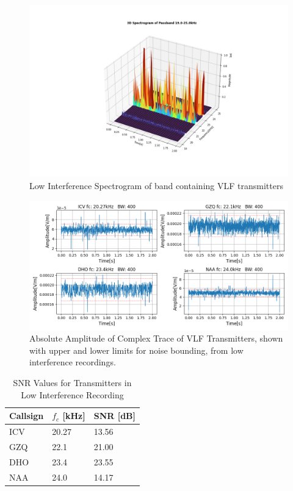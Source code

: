 \begin{figure}
    \centering
    \includegraphics[width = \textwidth]{figs/sig_character/Charmy/3dspectrogram.png}
    \caption{Low Interference Spectrogram of band containing VLF transmitters}
    \label{fig:charmy3Dspect}
\end{figure}

\begin{figure}
    \centering
    \includegraphics[width = \textwidth]{figs/sig_character/Charmy/abs_amplitude.png}
    \caption{\centering Absolute Amplitude of Complex Trace of VLF Transmitters, shown with upper and lower limits for noise bounding, from low interference recordings.}
    \label{fig:charmyAmp}
\end{figure}


\begin{table}[h!]
\centering
\begin{tabular}{l|l|l}
Callsign & $f_c$ {[}kHz{]} & SNR {[}dB{]} \\
\hline
ICV & 20.27 & 13.56 \\
GZQ & 22.1 & 21.00 \\
DHO & 23.4 & 23.55 \\
NAA & 24.0 & 14.17
\end{tabular}
\caption{SNR Values for Transmitters in Low Interference Recording}
\label{tab:snrCharmy}
\end{table}

